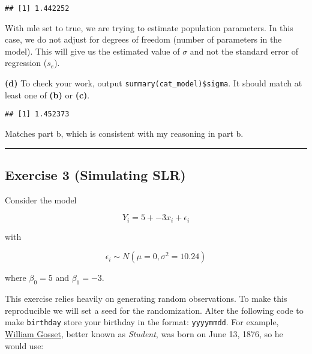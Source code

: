 \documentclass[]{article}
\newenvironment{Shaded}{\begin{snugshade}}{\end{snugshade}}
\newcommand{\KeywordTok}[1]{\textcolor[rgb]{0.13,0.29,0.53}{\textbf{#1}}}
\newcommand{\DataTypeTok}[1]{\textcolor[rgb]{0.13,0.29,0.53}{#1}}
\newcommand{\OtherTok}[1]{\textcolor[rgb]{0.56,0.35,0.01}{#1}}
\newcommand{\OperatorTok}[1]{\textcolor[rgb]{0.81,0.36,0.00}{\textbf{#1}}}
\newcommand{\NormalTok}[1]{#1}
\begin{document}
\begin{Shaded}
\end{Shaded}

\begin{verbatim}
## [1] 1.442252
\end{verbatim}

With mle set to true, we are trying to estimate population parameters.
In this case, we do not adjust for degrees of freedom (number of
parameters in the model). This will give us the estimated value of
\({\sigma}\) and not the standard error of regression (\(s_e\)).

\textbf{(d)} To check your work, output
\texttt{summary(cat\_model)\$sigma}. It should match at least one of
\textbf{(b)} or \textbf{(c)}.

\begin{Shaded}
\end{Shaded}

\begin{verbatim}
## [1] 1.452373
\end{verbatim}

Matches part b, which is consistent with my reasoning in part b.

\begin{center}\rule{0.5\linewidth}{\linethickness}\end{center}

\subsection{Exercise 3 (Simulating
SLR)}\label{exercise-3-simulating-slr}

Consider the model

\[
Y_i = 5 + -3 x_i + \epsilon_i
\]

with

\[
\epsilon_i \sim N(\mu = 0, \sigma^2 = 10.24)
\]

where \(\beta_0 = 5\) and \(\beta_1 = -3\).

This exercise relies heavily on generating random observations. To make
this reproducible we will set a seed for the randomization. Alter the
following code to make \texttt{birthday} store your birthday in the
format: \texttt{yyyymmdd}. For example,
\href{https://en.wikipedia.org/wiki/William_Sealy_Gosset}{William
Gosset}, better known as \emph{Student}, was born on June 13, 1876, so
he would use:
\end{document}
